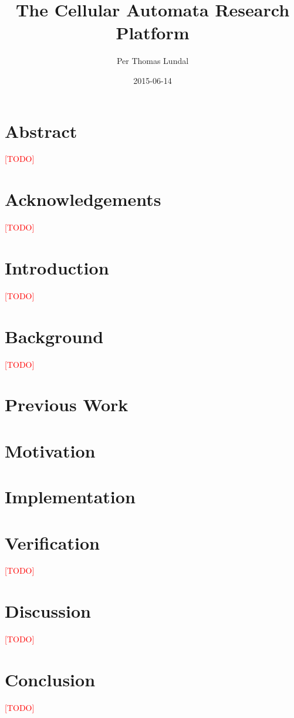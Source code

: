 \documentclass[a4paper]{report}
\title{
    {The Cellular Automata Research Platform}\\
    \TODO
}
\author{Per Thomas Lundal}
\date{2015-06-14}
\newcommand\TODO{\textcolor{red}{[TODO]}}
\begin{document}
\maketitle

\newpage
{}

\chapter*{Abstract}
    \TODO

\chapter*{Acknowledgements}
    \TODO

\tableofcontents

\newpage
{}

\chapter{Introduction}
    \label{ch:introduction}
    \TODO

\chapter{Background}
    \label{ch:background}
    \TODO

\chapter{Previous Work}
    \label{ch:previous-work}
    

\chapter{Motivation}
    \label{ch:motivation}
    

\chapter{Implementation}
    \label{ch:implementation}
    

\chapter{Verification}
    \label{ch:verification}
    \TODO

\chapter{Discussion}
    \label{ch:discussion}
    \TODO

\chapter{Conclusion}
    \label{ch:conclusion}
    \TODO



\end{document}
